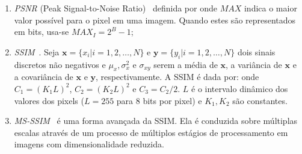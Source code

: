 \begin{enumerate}
    \item \textit{\acrshort{PSNR}} (Peak Signal-to-Noise Ratio)~\cite{sayood2017introduction} definida por  onde $MAX$ indica o maior valor possível para o pixel em uma imagem. Quando estes são representados em bits, usa-se $MAX_I = 2^B - 1$;
    \item \textit{\acrshort{SSIM}}~\cite{wang2004image}. Seja $\mathbf{x} = \{x_i|i = 1,2,\dots,N\}$ e $\mathbf{y} = \{y_i|i = 1,2,\dots,N\}$ dois sinais discretos não negativos e $\mu_x, \sigma_x^2$ e $\sigma_{xy}$ serem a média de $\mathbf{x}$, a variância de $\mathbf{x}$ e a covariância de $\mathbf{x}$ e $\mathbf{y}$, respectivamente. A \acrshort{SSIM} é dada por:
     onde $C_1 = {(K_1L)}^2$, $C_2 = {(K_2L)}^2$ e $C_3 = C_2/2$. $L$ é o intervalo dinâmico dos valores dos pixels ($L = 255$ para 8 bits por pixel) e $K_1, K_2$ são constantes.
    \item \textit{\acrshort{MS-SSIM}}~\cite{wang2003multiscale} é uma forma avançada da \acrshort{SSIM}. Ela é conduzida sobre múltiplas escalas através de um processo de múltiplos estágios de processamento em imagens com dimensionalidade reduzida.
\end{enumerate}
